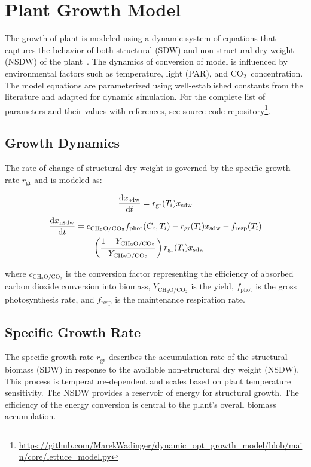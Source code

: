 \documentclass[conference]{IEEEtran}
\newcommand{\ui}[2]{#1_{\mathrm{#2}}}
\newcommand{\coo}{\ensuremath{\mathrm{CO_2}}}
\newcommand{\chho}{\ensuremath{\mathrm{CH_2O}}}
\begin{document}
\section{Plant Growth Model}\label{sec:lettuce_growth}
The growth of plant is modeled using a dynamic system of equations that captures the behavior of both structural (SDW) and non-structural dry weight (NSDW) of the plant~\cite{VANHENTEN199455}. The dynamics of conversion of  model is influenced by environmental factors such as temperature, light (PAR), and \coo\ concentration. The model equations are parameterized using well-established constants from the literature and adapted for dynamic simulation. For the complete list of parameters and their values with references, see source code repository\footnote{\url{https://github.com/MarekWadinger/dynamic_opt_growth_model/blob/main/core/lettuce_model.py}}.

\subsection{Growth Dynamics} The rate of change of structural dry weight is governed by the specific growth rate \( \ui{r}{gr} \) and is modeled as:

\begin{equation}
    \diff{\ui{x}{sdw}}{t} = \ui{r}{gr}(T_i) \ui{x}{sdw}
\end{equation}
\begin{equation}
    \begin{aligned}
        \diff{\ui{x}{nsdw}}{t} & = c_{\chho/\coo} \ui{f}{phot}(C_c, T_i) - \ui{r}{gr}(T_i) \ui{x}{sdw} - \ui{f}{resp}(T_i)    \\
                               & \quad - \left( \frac{1 - Y_{\chho/\coo}}{Y_{\chho/\coo}} \right) \ui{r}{gr}(T_i) \ui{x}{sdw}
    \end{aligned}
\end{equation}

where \( c_{\chho/\coo} \) is the conversion factor representing the efficiency of absorbed carbon dioxide conversion into biomass, \( Y_{\chho/\coo} \) is the yield, \( \ui{f}{phot} \) is the gross photosynthesis rate, and \( \ui{f}{resp} \) is the maintenance respiration rate.

\subsection{Specific Growth Rate} The specific growth rate \( \ui{r}{gr} \) describes the accumulation rate of the structural biomass (SDW) in response to the available non-structural dry weight (NSDW). This process is temperature-dependent and scales based on plant temperature sensitivity. The NSDW provides a reservoir of energy for structural growth. The efficiency of the energy conversion is central to the plant's overall biomass accumulation.
\end{document}
